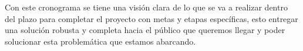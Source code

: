 \documentclass{article}
\begin{document}
\vspace{1em}
\noindent Con este cronograma se tiene una visión clara de lo que se va a realizar dentro del plazo para completar el proyecto con metas y etapas específicas, esto entregar una solución robusta y completa hacia el público que queremos llegar y poder solucionar esta problemática que estamos abarcando.
\end{document}
